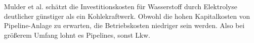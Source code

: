 %
Mulder et al. \cite{mulder2019outlook} schätzt die Investitionskosten für Wasserstoff durch Elektrolyse deutlicher günstiger als ein Kohlekraftwerk. 
Obwohl die hohen Kapitalkosten von Pipeline-Anlage zu erwarten, die Betriebskosten niedriger sein werden. Also bei größerem Umfang lohnt es Pipelines, sonst Lkw.